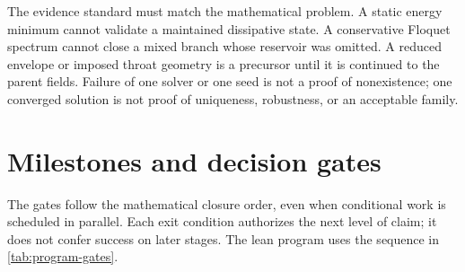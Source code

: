 The evidence standard must match the mathematical problem. A static energy
minimum cannot validate a maintained dissipative state. A conservative Floquet
spectrum cannot close a mixed branch whose reservoir was omitted. A reduced
envelope or imposed throat geometry is a precursor until it is continued to the
parent fields. Failure of one solver or one seed is not a proof of nonexistence;
one converged solution is not proof of uniqueness, robustness, or an acceptable
family.

\section{Milestones and decision gates}

The gates follow the mathematical closure order, even when conditional work is
scheduled in parallel. Each exit condition authorizes the next level of claim;
it does not confer success on later stages. The lean program uses the sequence
in \cref{tab:program-gates}.

